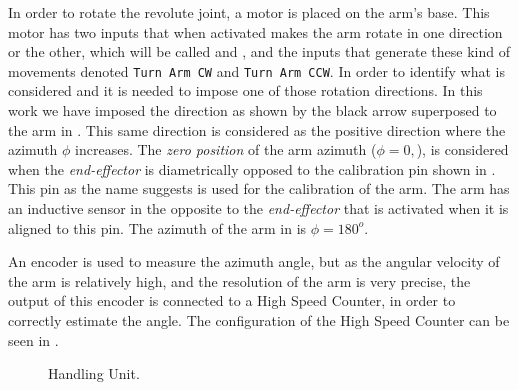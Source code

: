 In order to rotate the revolute joint, a motor is placed
on the arm's base. This motor has two inputs that when activated makes the arm
rotate in one direction or the other, which will be called \CW{} and \CCW, and
the inputs that generate these kind of movements denoted
\verb|Turn Arm CW| and \verb|Turn Arm CCW|.
In order to identify what is considered
\CW{} and \CCW{} it is needed to impose one of those rotation directions. In this
work we have imposed the \CCW{} direction as shown by the black arrow superposed to
the arm in . This same direction is considered as the
positive direction where the azimuth $\phi$ increases. The
\emph{zero position} of the arm azimuth ($\phi=0,$), is considered when the
\emph{end-effector} is diametrically opposed to the calibration pin shown in
. This pin as the name suggests is used for the
calibration of the arm. The arm has an inductive sensor in the opposite to the
\emph{end-effector} that is activated when
it is aligned to this pin.  The azimuth of the arm in  is
$\phi=180^o$.

An encoder is used to measure the
azimuth angle, but as the angular velocity of the arm is relatively high, and
the resolution of the arm is very precise, the output of this encoder is connected to a High Speed
Counter, in order to correctly estimate the angle. The configuration
of the High Speed Counter can be seen in \cite{rochapereira2019automacao,antunesfloriano2019sincronizacao}.
\begin{figure}[H]
  \centering
  \caption{Handling Unit.}
  \label{fig:handlingUnit}
\end{figure}


